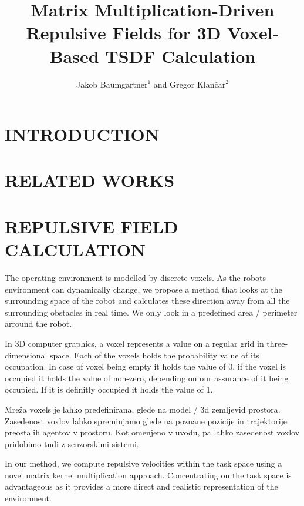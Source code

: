 \documentclass[letterpaper, 10 pt, conference]{ieeeconf}  %
\title{\LARGE \bf
Matrix Multiplication-Driven Repulsive Fields for 3D Voxel-Based TSDF Calculation
}
\author{
	Jakob Baumgartner$^{1}$ and Gregor Klančar$^{2}$%
}
\begin{document}
\maketitle
\thispagestyle{empty}
\pagestyle{empty}


\begin{abstract}



\end{abstract}


\section{INTRODUCTION}

\section{RELATED WORKS}

\section{REPULSIVE FIELD CALCULATION}

The operating environment is modelled by discrete voxels. As the robots environment can dynamically change, we propose a method that looks at the surrounding space of the robot and calculates these direction away from all the surrounding obstacles in real time. We only look in a predefined area / perimeter arround the robot.  

In 3D computer graphics, a voxel represents a value on a regular grid in three-dimensional space. Each of the voxels holds the probability value of its occupation. In case of voxel being empty it holds the value of 0, if the voxel is occupied it holds the value of non-zero, depending on our assurance of it being occupied. If it is definitly occupied it holds the value of 1. 

Mreža voxels je lahko predefinirana, glede na model / 3d zemljevid prostora. Zasedenost voxlov lahko spreminjamo glede na poznane pozicije in trajektorije preostalih agentov v prostoru. Kot omenjeno v uvodu, pa lahko zasedenost voxlov pridobimo tudi z senzorskimi sistemi. 

In our method, we compute repulsive velocities within the task space using a novel matrix kernel multiplication approach. Concentrating on the task space is advantageous as it provides a more direct and realistic representation of the environment. 
\end{document}
